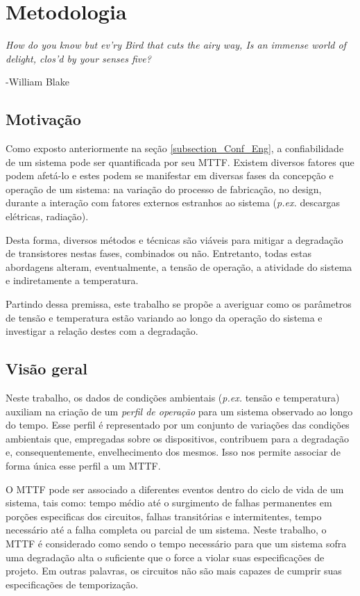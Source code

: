 \chapter{Metodologia}
\epigraph{\textit{How do you know but ev’ry Bird that cuts the airy way, Is an immense world of delight, clos’d by your senses five?}}{-William Blake}
\section{Motivação}
Como exposto anteriormente na seção \ref{subsection_Conf_Eng}, a confiabilidade de um sistema pode ser quantificada por seu MTTF. Existem diversos fatores que podem afetá-lo e estes podem se manifestar em diversas fases da concepção e operação de um sistema: na variação do processo de fabricação, no design, durante a interação com fatores externos estranhos ao sistema (\textit{p.ex.} descargas elétricas, radiação).

Desta forma, diversos métodos e técnicas são viáveis para mitigar a degradação de transistores nestas fases, combinados ou não. Entretanto, todas estas abordagens alteram, eventualmente, a tensão de operação, a atividade do sistema e indiretamente a temperatura.

Partindo dessa premissa, este trabalho se propõe a averiguar como os parâmetros de tensão e temperatura estão variando ao longo da operação do sistema e investigar a relação destes com a degradação.

\section{Visão geral}
Neste trabalho, os dados de condições ambientais (\textit{p.ex.} tensão e temperatura) auxiliam na criação de um \textit{perfil de operação} para um sistema observado ao longo do tempo. Esse perfil é representado por um conjunto de variações das condições ambientais que, empregadas sobre os dispositivos, contribuem para a degradação e, consequentemente, envelhecimento dos mesmos. Isso nos permite associar de forma única esse perfil a um MTTF.

O MTTF pode ser associado a diferentes eventos dentro do ciclo de vida de um sistema, tais como: tempo médio até o surgimento de falhas permanentes em porções especificas dos circuitos, falhas transitórias e intermitentes, tempo necessário até a falha completa ou parcial de um sistema. Neste trabalho, o MTTF é considerado como sendo o tempo necessário para que um sistema sofra uma degradação alta o suficiente que o force a violar suas especificações de projeto. Em outras palavras, os circuitos não são mais capazes de cumprir suas especificações de temporização.

